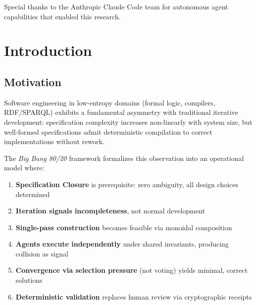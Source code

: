 \documentclass[12pt,oneside,a4paper]{book}
\newcommand{\BB}{\textit{Big Bang 80/20}\xspace}
\theoremstyle{definition}
\begin{document}
Special thanks to the Anthropic Claude Code team for autonomous agent capabilities
that enabled this research.

\tableofcontents

\listoffigures

\listoftables


\mainmatter

\chapter{Introduction}
\label{ch:intro}

\section{Motivation}
\label{sec:intro-motivation}

Software engineering in low-entropy domains (formal logic, compilers, RDF/SPARQL)
exhibits a fundamental asymmetry with traditional iterative development:
specification complexity increases non-linearly with system size, but well-formed
specifications admit deterministic compilation to correct implementations without
rework.

The \BB framework formalizes this observation into an operational model where:

\begin{enumerate}
  \item \textbf{Specification Closure} is prerequisite: zero ambiguity, all design choices determined
  \item \textbf{Iteration signals incompleteness}, not normal development
  \item \textbf{Single-pass construction} becomes feasible via monoidal composition
  \item \textbf{Agents execute independently} under shared invariants, producing collision as signal
  \item \textbf{Convergence via selection pressure} (not voting) yields minimal, correct solutions
  \item \textbf{Deterministic validation} replaces human review via cryptographic receipts
\end{enumerate}
\end{document}
